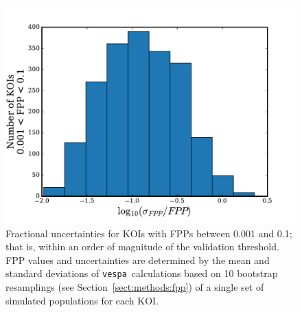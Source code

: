 \documentclass{emulateapj}
\newcommand{\figlabel}[1]{\label{fig:#1}}
\newcommand{\sectionname}{Section}
\newcommand{\Sect}[1]{\sectionname~\ref{sect:#1}}
\newcommand{\sect}[1]{\Sect{#1}}
\newcommand{\vespa}{\texttt{vespa}}
\begin{document}
\begin{figure}[p]
\begin{center}
\includegraphics[width=7in]{figures/sigmafpp.pdf}
\end{center}
\caption{Fractional uncertainties for KOIs with FPPs between
  0.001 and 0.1; that is, within an order of magnitude of the 
  validation threshold.  FPP values and uncertainties 
  are determined by the mean and standard deviations 
  of \vespa\ calculations based on 
  10 bootstrap resamplings (see \sect{methods:fpp}) of 
  a single set of simulated populations for each KOI.
  \figlabel{sigmafpp}}
\end{figure}
\end{document}
